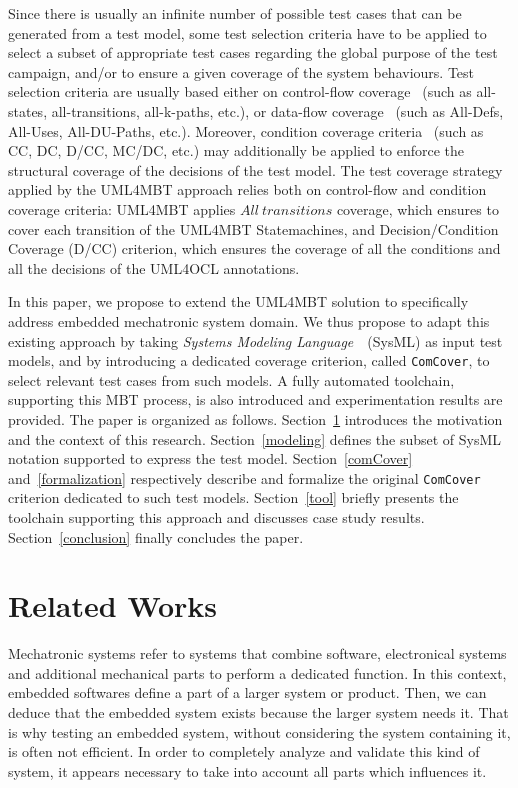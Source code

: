 \documentclass{llncs}
\begin{document}
Since there is usually an infinite number of possible test cases that
can be generated from a test model, some test selection criteria have
to be applied to select a subset of appropriate test cases regarding
the global purpose of the test campaign, and/or to ensure a given
coverage of the system behaviours. Test selection criteria are usually
based either on control-flow coverage~\cite{OXL99} (such as
all-states, all-transitions, all-k-paths, etc.), or data-flow
coverage~\cite{RW85} (such as All-Defs, All-Uses, All-DU-Paths,
etc.). Moreover, condition coverage criteria~\cite{Vilkomir01} (such as
CC, DC, D/CC, MC/DC, etc.) may additionally be applied to enforce the
structural coverage of the decisions of the test model. The test
coverage strategy applied by the UML4MBT approach relies both on
control-flow and condition coverage criteria: UML4MBT applies
$All~transitions$ coverage, which ensures to cover each
transition of the UML4MBT Statemachines, and Decision/Condition
Coverage (D/CC) criterion, which ensures the coverage of all the
conditions and all the decisions of the UML4OCL annotations. 

In this paper, we propose to extend the UML4MBT solution to
specifically address embedded mechatronic system domain. We thus
propose to adapt this existing approach by taking \textit{Systems
  Modeling Language}~\cite{FMS09}~(SysML) as input test models, and 
by introducing a dedicated coverage criterion, called
\texttt{ComCover}, to select relevant test cases from such models. 
A fully automated toolchain, supporting this MBT process, is also 
introduced and experimentation results are provided. 
The paper is organized as follows. Section~\ref{relatedWorks}
introduces the motivation and the context of this
research. Section~\ref{modeling} defines the subset of SysML notation
supported to express the test model. Section~\ref{comCover}
and~\ref{formalization} respectively describe and formalize the
original \texttt{ComCover} criterion dedicated to such test
models. Section~\ref{tool} briefly presents the toolchain supporting
this approach and discusses case study
results. Section~\ref{conclusion} finally concludes the paper. 

\section{Related Works}
\label{relatedWorks}
Mechatronic systems refer to systems that combine software,
electronical systems and additional mechanical parts to perform a 
dedicated function. In this context, embedded softwares define a part
of a larger system or product. Then, we can deduce that the embedded
system exists because the larger system needs it. That is why testing
an embedded system, without considering the system containing it, is
often not efficient. In order to completely analyze and validate this
kind of system, it appears necessary to take into account all
parts which influences it. 
\end{document}
